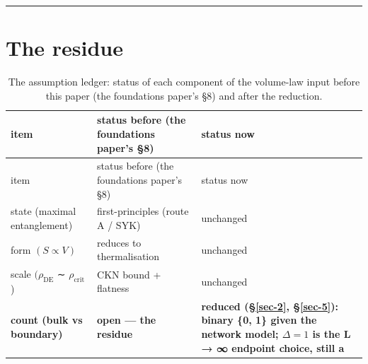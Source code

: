 \documentclass[12pt]{iopart}
\begin{document}
\begin{center}\rule{0.5\linewidth}{0.5pt}\end{center}

\section{The residue}\label{sec-7}

\begin{longtable}[]{@{}
  >{\raggedright\arraybackslash}p{}
  >{\raggedright\arraybackslash}p{}
  >{\raggedright\arraybackslash}p{}@{}}
\caption{The assumption ledger: status of each component of the
volume-law input before this paper (the foundations paper's §8) and
after the reduction.}\tabularnewline
\toprule\noalign{}
\begin{minipage}[b]{\linewidth}\raggedright
item
\end{minipage} & \begin{minipage}[b]{\linewidth}\raggedright
status before (the foundations paper's §8)
\end{minipage} & \begin{minipage}[b]{\linewidth}\raggedright
status now
\end{minipage} \\
\midrule\noalign{}
\endfirsthead
\toprule\noalign{}
\begin{minipage}[b]{\linewidth}\raggedright
item
\end{minipage} & \begin{minipage}[b]{\linewidth}\raggedright
status before (the foundations paper's §8)
\end{minipage} & \begin{minipage}[b]{\linewidth}\raggedright
status now
\end{minipage} \\
\midrule\noalign{}
\endhead
\bottomrule\noalign{}
\endlastfoot
state (maximal entanglement) & first-principles (route A / SYK) &
unchanged \\
form \((S \propto  V)\) & reduces to thermalisation & unchanged \\
scale \((\rho _\mathrm{DE}\) ∼ \(\rho _{\mathrm{crit}}\)) & CKN bound +
flatness & unchanged \\
\textbf{count (bulk vs boundary)} & \textbf{open --- the residue} &
\textbf{reduced (§\ref{sec-2}, §\ref{sec-5}): binary \{0, 1\} given the
network model; \(\Delta  = 1\) is the L → ∞ endpoint choice, still a
}
\end{longtable}
\end{document}
